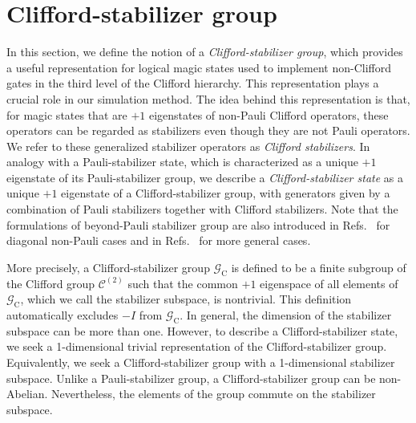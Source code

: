 \documentclass[
 reprint,
 amsmath,amssymb,
 pra,superscriptaddress, nofootinbib
]{revtex4-2}
\theoremstyle{definition}
\theoremstyle{plain}
\newcommand{\cC}{\mathcal C}
\begin{document}
\section{Clifford-stabilizer group}
\label{sec:clifford_stabilizer}

In this section, we define the notion of a \emph{Clifford-stabilizer group}, which provides a useful representation for logical magic states used to implement non-Clifford gates in the third level of the Clifford hierarchy. This representation plays a crucial role in our simulation method. 
The idea behind this representation is that, for magic states that are $+1$ eigenstates of non-Pauli Clifford operators, these operators can be regarded as stabilizers even though they are not Pauli operators.
We refer to these generalized stabilizer operators as \emph{Clifford stabilizers}. In analogy with a Pauli-stabilizer state, which is characterized as a unique $+1$ eigenstate of its Pauli-stabilizer group, we describe a \emph{Clifford-stabilizer state} as a unique $+1$ eigenstate of a Clifford-stabilizer group, with generators given by a combination of Pauli stabilizers together with Clifford stabilizers. 
Note that the formulations of beyond-Pauli stabilizer group are also introduced in Refs.~\cite{ni2015non,Webster2022xpstabiliser} for diagonal non-Pauli cases and in Refs.~\cite{nest2011monomial,erew2026extremizingmeasuresmagicpure} for more general cases.

More precisely, a Clifford-stabilizer group $\mathcal{G}_\mathrm{C}$ is defined to be a finite subgroup of the Clifford group $\cC^{(2)}$ such that the common $+1$ eigenspace of all elements of $\mathcal{G}_\mathrm{C}$, which we call the stabilizer subspace, is nontrivial. This definition automatically excludes $-I$ from $\mathcal{G}_\mathrm{C}$. 
In general, the dimension of the stabilizer subspace can be more than one. However, to describe a Clifford-stabilizer state, we seek a 1-dimensional trivial representation of the Clifford-stabilizer group.  
Equivalently, we seek a Clifford-stabilizer group with a 1-dimensional stabilizer subspace.
Unlike a Pauli-stabilizer group, a Clifford-stabilizer group can be non-Abelian.  Nevertheless, the elements of the group commute on the stabilizer subspace.
\end{document}
